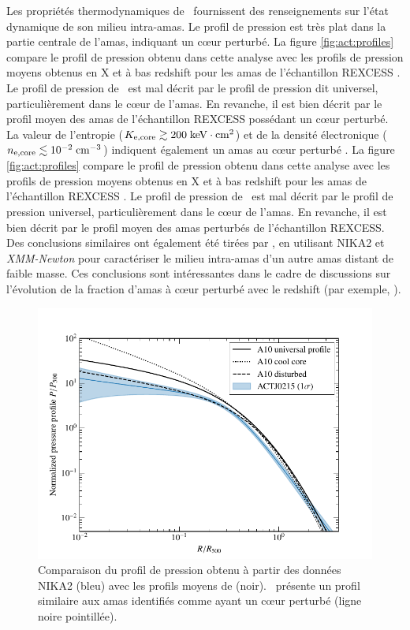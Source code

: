 Les propriétés thermodynamiques de \act\ fournissent des renseignements sur l'état dynamique de son milieu intra-amas.
Le profil de pression est très plat dans la partie centrale de l'amas, indiquant un cœur perturbé.
La figure \ref{fig:act:profiles} compare le profil de pression obtenu dans cette analyse avec les profils de pression moyens obtenus en X et à bas redshift pour les amas de l'échantillon REXCESS \cite{arnaud_universal_2010}.
Le profil de pression de \act\ est mal décrit par le profil de pression dit universel, particulièrement dans le cœur de l'amas.
En revanche, il est bien décrit par le profil moyen des amas de l'échantillon REXCESS possédant un cœur perturbé.
La valeur de l'entropie ($K_{{\rm e},\mathrm{core}} \gtrsim 200\;\mathrm{keV\cdot cm^2}$) et de la densité électronique ($n_{{\rm e},\mathrm{core}} \lesssim 10^{-2}\;\mathrm{cm^{-3}}$) indiquent également un amas au cœur perturbé \cite{hudson_what_2010}.
La figure \ref{fig:act:profiles} compare le profil de pression obtenu dans cette analyse avec les profils de pression moyens obtenus en X et à bas redshift pour les amas de l'échantillon REXCESS \cite{arnaud_universal_2010}.
Le profil de pression de \act\ est mal décrit par le profil de pression universel, particulièrement dans le cœur de l'amas.
En revanche, il est bien décrit par le profil moyen des amas perturbés de l'échantillon REXCESS.
Des conclusions similaires ont également été tirées par , en utilisant NIKA2 et \textit{XMM-Newton} pour caractériser le milieu intra-amas d'un autre amas distant de faible masse.
Ces conclusions sont intéressantes dans le cadre de discussions sur l'évolution de la fraction d'amas à cœur perturbé avec le redshift (par exemple, \cite{mcdonald_remarkable_2017,ruppin_stability_2020}).

\begin{figure}[t]
    \centering
    \includegraphics[width=0.6\linewidth, trim={.35cm .2cm .35cm 1cm}, clip]{Figures/Chap_actj0215/pressure_vs_upp.pdf}
    \caption{%
        Comparaison du profil de pression obtenu à partir des données NIKA2 (bleu) avec les profils moyens de  (noir).
        \act\ présente un profil similaire aux amas identifiés comme ayant un cœur perturbé (ligne noire pointillée).
        }
        \label{fig:act:press_upp}
\end{figure}

